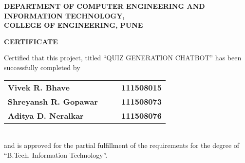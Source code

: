 % 
\thispagestyle{empty}
\linespread{2}
\begin{center}			%
	\Large{\bf{DEPARTMENT OF COMPUTER ENGINEERING AND\\  INFORMATION TECHNOLOGY,\\ 
	       COLLEGE OF ENGINEERING, PUNE\\}}	
\end{center}

\vspace{20pt}			%

\begin{center}
	\Large{\bf{CERTIFICATE\\}}
\end{center}

\vspace{20pt}

\linespread{1.5}			%
\selectfont
\large{
Certified that this project, titled ``QUIZ GENERATION CHATBOT''
has been successfully completed by \\ 
\begin{table}[htbp]
	\begin{center}
	\begin{tabular}{ l c c l }
	\Large\bf{Vivek R. Bhave} & & & \Large\bf{111508015} \\ [0.3cm]
	\Large\bf{Shreyansh R. Gopawar} & & & \Large\bf{111508073} \\ [0.3cm]
 	\Large\bf{Aditya D. Neralkar} & & & \Large\bf{111508076} \\ [0.3cm]
	\end{tabular}
	\end{center}
	\end{table} \\
and is approved for the partial fulfillment of the requirements for the degree of 
``B.Tech. Information Technology''.
}


